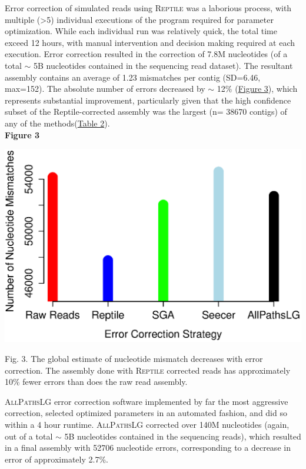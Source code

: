 \documentclass[11pt]{article}
\begin{document}
\noindent
Error correction of simulated reads using \textsc{Reptile} was a laborious process, with multiple (\textgreater 5) individual executions of the program required for parameter optimization. While each individual run was relatively quick, the total time exceed 12 hours, with manual intervention and decision making required at each execution.  Error correction resulted in the correction of 7.8M nucleotides (of a total $\sim$ 5B nucleotides contained in the sequencing read dataset). The resultant assembly contains an average of 1.23 mismatches per contig (SD=6.46, max=152).  The absolute number of errors decreased by $\sim$ 12\% (\hyperlink{Figure 3}{Figure 3}), which represents substantial improvement, particularly given that the high confidence subset of the Reptile-corrected assembly was the largest (n= 38670 contigs) of any of the methods(\hyperlink{Table 2}{Table 2}). \\

\textbf{\hypertarget{Figure 3}{Figure 3}} \\
\centerline{\includegraphics[width=12.0\baselineskip]{newfig2b.eps}}
\begin{changemargin}{2cm}{2cm}
\noindent
Fig. 3. The global estimate of nucleotide mismatch decreases with error correction. The assembly done with \textsc{Reptile} corrected reads has approximately 10\% fewer errors than does the raw read assembly. 
\end{changemargin}
\vspace{10mm}


\noindent
\textsc{AllPathsLG} error correction software implemented by far the most aggressive correction, selected optimized parameters in an automated fashion, and did so within a 4 hour runtime.  \textsc{AllPathsLG} corrected over 140M nucleotides (again, out of a total $\sim$ 5B nucleotides contained in the sequencing reads), which resulted in a final assembly with 52706 nucleotide errors, corresponding to a decrease in error of approximately 2.7\%.   \\
\end{document}
